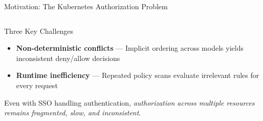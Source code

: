 \documentclass[aspectratio=169,10pt]{beamer}
\begin{document}
\begin{frame}[t]{Motivation: The Kubernetes Authorization Problem}
\begin{columns}[T,onlytextwidth]
\begin{column}{0.52\textwidth}
\begin{callout}[fonttitle=\bfseries\small,fontupper=\footnotesize]{Three Key Challenges}
\begin{itemize}
\item \textbf{Non-deterministic conflicts} --- Implicit ordering across models yields inconsistent deny/allow decisions
\item \textbf{Runtime inefficiency} --- Repeated policy scans evaluate irrelevant rules for every request
\end{itemize}
\end{callout}
\vspace{3pt}
\begin{center}
\begin{tcolorbox}[colback=uhapGray,colframe=uhapGray,
                  boxrule=0pt,arc=1mm,
                  left=6pt,right=6pt,top=2pt,bottom=2pt,
                  width=0.97\linewidth,
                  borderline west={2pt}{0pt}{uhapTeal}]
\footnotesize\color{uhapNavyD}Even with SSO handling authentication, \emph{authorization across multiple resources remains fragmented, slow, and inconsistent}.
\end{tcolorbox}
\end{center}
\end{column}
\end{columns}
\end{frame}
\end{document}
